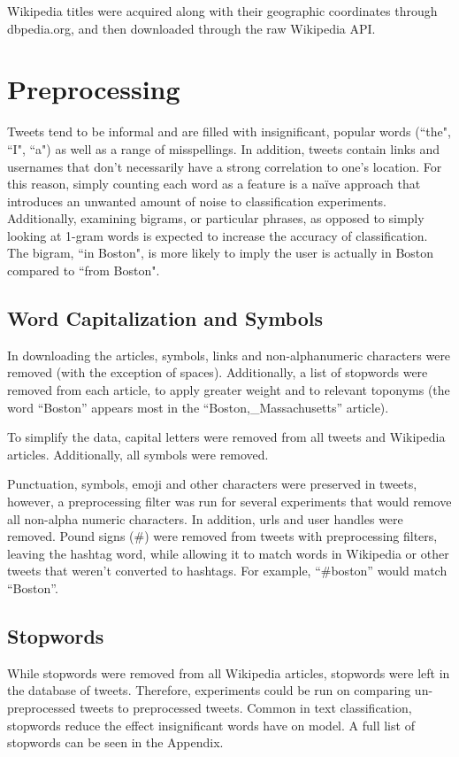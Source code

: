 \documentclass[midd]{thesis}
\begin{document}
Wikipedia titles were acquired along with their geographic coordinates through dbpedia.org, and then downloaded through the raw Wikipedia API.


\section{Preprocessing}
Tweets tend to be informal and are filled with insignificant, popular words (``the", ``I", ``a") as well as a range of misspellings. In addition, tweets contain links and usernames that don't necessarily have a strong correlation to one's location. For this reason, simply counting each word as a feature is a naïve approach that introduces an unwanted amount of noise to classification experiments. Additionally, examining bigrams, or particular phrases, as opposed to simply looking at 1-gram words is expected to increase the accuracy of classification. The bigram, ``in Boston", is more likely to imply the user is actually in Boston compared to ``from Boston".

\subsection{Word Capitalization and Symbols}

 In downloading the articles, symbols, links and non-alphanumeric characters were removed (with the exception of spaces). Additionally, a list of stopwords were removed from each article, to apply greater weight and to relevant toponyms (the word ``Boston'' appears most in the ``Boston,\_Massachusetts'' article).

To simplify the data, capital letters were removed from all tweets and Wikipedia articles. Additionally, all symbols were removed. 

Punctuation, symbols, emoji and other characters were preserved in tweets, however, a preprocessing filter was run for several experiments that would remove all non-alpha numeric characters. In addition, urls and user handles were removed. Pound signs (\#) were removed from tweets with preprocessing filters, leaving the hashtag word, while allowing it to match words in Wikipedia or other tweets that weren't converted to hashtags. For example, ``\#boston'' would match ``Boston''. 


\subsection{Stopwords}
While stopwords were removed from all Wikipedia articles, stopwords were left in the database of tweets. Therefore, experiments could be run on comparing un-preprocessed tweets to preprocessed tweets. Common in text classification, stopwords reduce the effect insignificant words have on model. A full list of stopwords can be seen in the Appendix.
\end{document}
